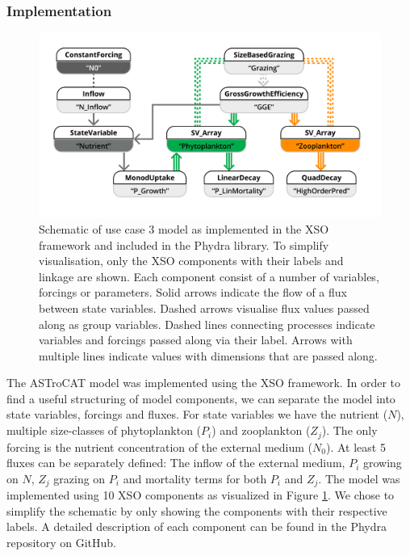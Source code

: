 \documentclass[journal abbreviation, manuscript]{copernicus}
\begin{document}
\subsubsection{Implementation}
\begin{figure}[t]
\includegraphics[width=15cm]{Figures/firstdraft_schematics/code_schematics/ASTroCAT.pdf}
\caption{Schematic of use case 3 model as implemented in the XSO framework and included in the Phydra library. To simplify visualisation, only the XSO components with their labels and linkage are shown. Each component consist of a number of variables, forcings or parameters. Solid arrows indicate the flow of a flux between state variables. Dashed arrows visualise flux values passed along as group variables. Dashed lines connecting processes indicate variables and forcings passed along via their label. Arrows with multiple lines indicate values with dimensions that are passed along.}
\label{Figure:CodeSchematics_3}
\end{figure}

The ASTroCAT model was implemented using the XSO framework. In order to find a useful structuring of model components, we can separate the model into state variables, forcings and fluxes. For state variables we have the nutrient ($N$), multiple size-classes of phytoplankton ($P_i$) and zooplankton ($Z_j$). The only forcing is the nutrient concentration of the external medium ($N_0$). At least 5 fluxes can be separately defined: The inflow of the external medium, $P_i$ growing on $N$, $Z_j$ grazing on $P_i$ and mortality terms for both $P_i$ and $Z_j$.
The model was implemented using 10 XSO components as visualized in Figure \ref{Figure:CodeSchematics_3}. We chose to simplify the schematic by only showing the components with their respective labels. A detailed description of each component can be found in the Phydra repository on GitHub.
\end{document}
